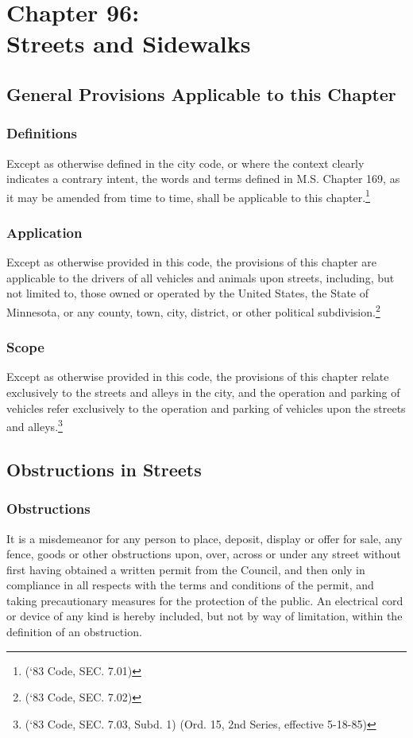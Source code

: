\chapter*{Chapter 96: \\
	Streets and Sidewalks}
    \minitoc
    \pagebreak

\section{General Provisions Applicable to this Chapter}
\subsection{Definitions}
Except as otherwise defined in the city code, or where the context clearly indicates a contrary intent, the words and terms defined in M.S. Chapter 169, as it may be amended from time to time, shall be applicable to this chapter.\footnote{(‘83 Code, SEC. 7.01)}
\subsection{Application}
Except as otherwise provided in this code, the provisions of this chapter are applicable to the drivers of all vehicles and animals upon streets, including, but not limited to, those owned or operated by the United States, the State of Minnesota, or any county, town, city, district, or other political subdivision.\footnote{(‘83 Code, SEC. 7.02)}
\subsection{Scope}
Except as otherwise provided in this code, the provisions of this chapter relate exclusively to the streets and alleys in the city, and the operation and parking of vehicles refer exclusively to the operation and parking of vehicles upon the streets and alleys.\footnote{(‘83 Code, SEC. 7.03, Subd. 1)  (Ord. 15, 2nd Series, effective 5-18-85)}
\section{Obstructions in Streets}
\subsection{Obstructions}
It is a misdemeanor for any person to place, deposit, display or offer for sale, any fence, goods or other obstructions upon, over, across or under any street without first having obtained a written permit from the Council, and then only in compliance in all respects with the terms and conditions of the permit, and taking precautionary measures for the protection of the public.  An electrical cord or device of any kind is hereby included, but not by way of limitation, within the definition of an obstruction.

